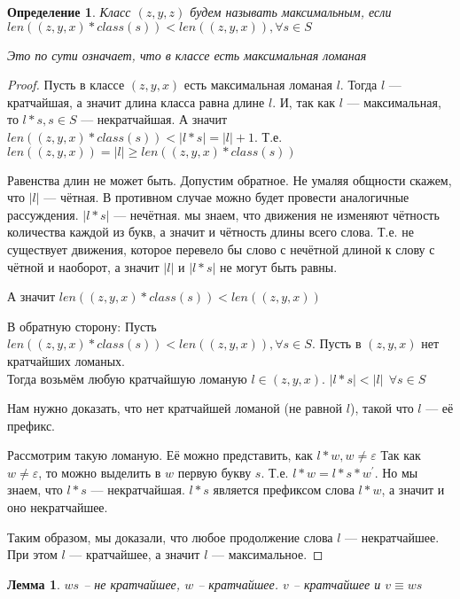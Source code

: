 \documentclass[12pt,a4paper, flushleft]{article}
\newtheorem{Def}{Определение}[section]
\newtheorem{Lm}{Лемма}[section]
\newcommand{\p}[1]{#1^{\prime}}
\begin{document}
\begin{Def}
	Класс $(z, y, z)$ будем называть максимальным, если $len((z, y, x)*class(s))<len((z, y, x)) , \forall s\in S$
	
	Это по сути означает, что в классе есть максимальная ломаная
\end{Def}
\begin{proof}
	Пусть в классе $(z, y, x)$ есть максимальная ломаная $l$. Тогда $l$ --- кратчайшая, а значит длина класса равна длине $l$. И, так как $l$ --- максимальная, то $l * s, s\in S$ --- некратчайшая. А значит $len((z, y, x)*class(s)) < |l*s| = |l|+1$. Т.е. $len((z, y, x)) = |l|\geqslant  len((z, y, x)*class(s))$
	
	Равенства длин не может быть. Допустим обратное. Не умаляя общности скажем, что $|l|$ --- чётная. В противном случае можно будет провести аналогичные рассуждения. $|l * s|$ --- нечётная. мы знаем, что движения не изменяют чётность количества каждой из букв, а значит и чётность длины всего слова. Т.е. не существует движения, которое перевело бы слово с нечётной длиной к слову с чётной и наоборот, а значит $|l|$ и $|l*s|$ не могут быть равны.
	
	А значит $len((z, y, x)*class(s))<len((z, y, x))$
	
	В обратную сторону: Пусть $len((z, y, x)*class(s))<len((z, y, x)) , \forall s\in S$. Пусть в $(z, y, x)$ нет кратчайших ломаных. \\Тогда возьмём любую кратчайшую ломаную $l\in (z, y, x)$. $|l*s| < |l|~~ \forall s\in S$
	
	Нам нужно доказать, что нет кратчайшей ломаной (не равной $l$), такой что $l$ --- её префикс.
	
	Рассмотрим такую ломаную. Её можно представить, как $l * w, w\neq \varepsilon$ Так как $w\neq \varepsilon$, то можно выделить в $w$ первую букву $s$. Т.е. $l*w = l*s*\p w$. Но мы знаем, что $l*s$ --- некратчайшая. $l*s$ является префиксом слова $l*w$, а значит и оно некратчайшее. 
	
	Таким образом, мы доказали, что любое продолжение слова $l$ --- некратчайшее. При этом $l$ --- кратчайшее, а значит $l$ --- максимальное.
	
	
\end{proof}	

\begin{Lm}
	$ws$ -- не кратчайшее, $w$ -- кратчайшее. $v$ -- кратчайшее и $v\equiv ws$
\end{Lm}
\end{document}
